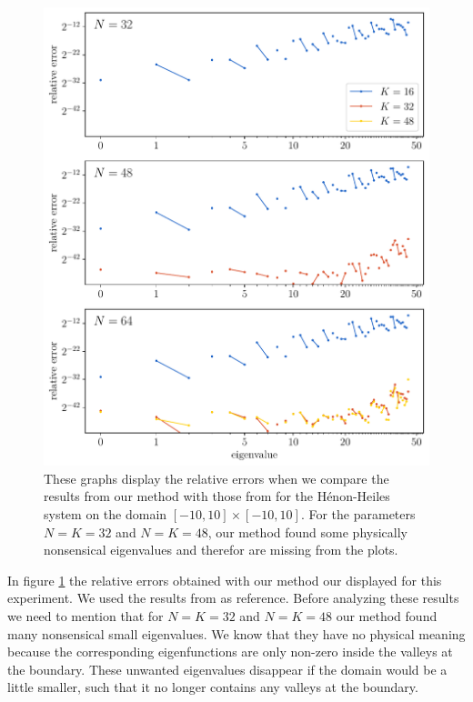 \begin{figure}
    \begin{center}
        \includegraphics[width=\textwidth]{img/chapter4/nm_test_henon.pdf}
    \end{center}
    \caption{These graphs display the relative errors when we compare the results from our method with those from \cite{wang_new_2009} for the Hénon-Heiles system on the domain $[-10, 10]\times[-10, 10]$. For the parameters $N = K = 32$ and $N = K = 48$, our method found some physically nonsensical eigenvalues and therefor are missing from the plots.}
    \label{fig:c4_nm_henon_test}
\end{figure}

In figure \ref{fig:c4_nm_henon_test} the relative errors obtained with our method our displayed for this experiment. We used the results from \cite{wang_new_2009} as reference. Before analyzing these results we need to mention that for $N = K = 32$ and $N = K = 48$ our method found many nonsensical small eigenvalues. We know that they have no physical meaning because the corresponding eigenfunctions are only non-zero inside the valleys at the boundary. These unwanted eigenvalues disappear if the domain would be a little smaller, such that it no longer contains any valleys at the boundary.

